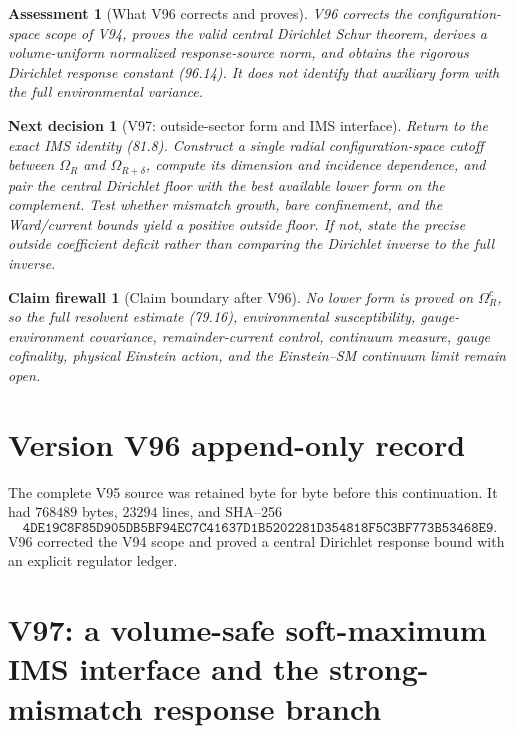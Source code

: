 \documentclass[11pt]{article}
\newtheorem{firewall}[theorem]{Claim firewall}
\newtheorem{decision}[theorem]{Next decision}
\newtheorem{assessment}[theorem]{Assessment}
\theoremstyle{remark}
\begin{document}
\begin{assessment}[What V96 corrects and proves]
\label{ass:v17v96-status}
V96 corrects the configuration-space scope of V94, proves the valid
central Dirichlet Schur theorem, derives a volume-uniform normalized
response-source norm, and obtains the rigorous Dirichlet response
constant (96.14).  It does not identify that auxiliary form with the
full environmental variance.
\end{assessment}

\begin{decision}[V97: outside-sector form and IMS interface]
\label{dec:v17v96-next}
Return to the exact IMS identity (81.8).  Construct a single radial
configuration-space cutoff between \(\Omega_R\) and
\(\Omega_{R+\delta}\), compute its dimension and incidence dependence,
and pair the central Dirichlet floor with the best available lower form
on the complement.  Test whether mismatch growth, bare confinement,
and the Ward/current bounds yield a positive outside floor.  If not,
state the precise outside coefficient deficit rather than comparing
the Dirichlet inverse to the full inverse.
\end{decision}

\begin{firewall}[Claim boundary after V96]
\label{fire:v17v96}
No lower form is proved on \(\Omega_R^c\), so the full resolvent
estimate (79.16), environmental susceptibility, gauge-environment
covariance, remainder-current control, continuum measure, gauge
cofinality, physical Einstein action, and the Einstein--SM continuum
limit remain open.
\end{firewall}

\section*{Version V96 append-only record}
The complete V95 source was retained byte for byte before this
continuation.  It had \(768489\) bytes, \(23294\) lines, and SHA--256
\[
 \texttt{4DE19C8F85D905DB5BF94EC7C41637D1B5202281D354818F5C3BF773B53468E9}.
\]
V96 corrected the V94 scope and proved a central Dirichlet response
bound with an explicit regulator ledger.


\section{V97: a volume-safe soft-maximum IMS interface and the strong-mismatch response branch}
\label{sec:v17v97}
\end{document}
